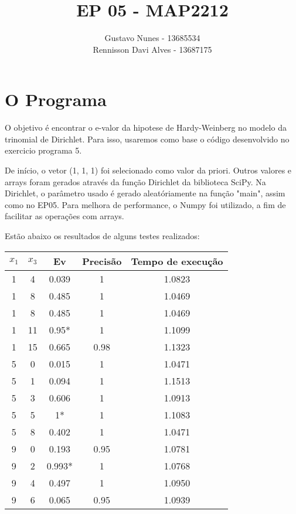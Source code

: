 \documentclass{article}
\date{}
\title{\vspace{-3.0cm}EP 05 - MAP2212}
\author{Gustavo Nunes - 13685534 \\Rennisson Davi Alves - 13687175}
\begin{document}
    \maketitle
        \section{O Programa}
        O objetivo é encontrar o e-valor da hipotese de Hardy-Weinberg no modelo da trinomial de Dirichlet.
        Para isso, usaremos como base o código desenvolvido no exercicio programa 5.

        De início, o vetor (1, 1, 1) foi selecionado como valor da priori. Outros valores e arrays foram gerados
        através da função Dirichlet da biblioteca SciPy. Na Dirichlet, o parâmetro usado é gerado aleatóriamente
        na função "main", assim como no EP05. Para melhora de performance, o Numpy foi utilizado, a fim de facilitar
        as operações com arrays.

        Estão abaixo os resultados de alguns testes realizados:

        \begin{table}[h]
            \centering
            \begin{tabular}{|c|c|c|c|c|}
                $x_1$ & $x_3$ & Ev & Precisão & Tempo de execução\\
                \hline
                1 & 4 & 0.039 & 1 & 1.0823 \\
                1 & 8 & 0.485 & 1 & 1.0469 \\
                1 & 8 & 0.485 & 1 & 1.0469 \\
                1 & 11 & 0.95* & 1 & 1.1099 \\
                1 & 15 & 0.665 & 0.98 & 1.1323 \\
                5 & 0 & 0.015 & 1 & 1.0471 \\
                5 & 1 & 0.094 & 1 & 1.1513 \\
                5 & 3 & 0.606 & 1 & 1.0913 \\
                5 & 5 & 1* & 1 & 1.1083 \\
                5 & 8 & 0.402 & 1 & 1.0471 \\
                9 & 0 & 0.193 & 0.95 & 1.0781 \\
                9 & 2 & 0.993* & 1 & 1.0768 \\
                9 & 4 & 0.497 & 1 & 1.0950 \\
                9 & 6 & 0.065 & 0.95 & 1.0939 \\
            \end{tabular}
        \end{table}
\end{document}
